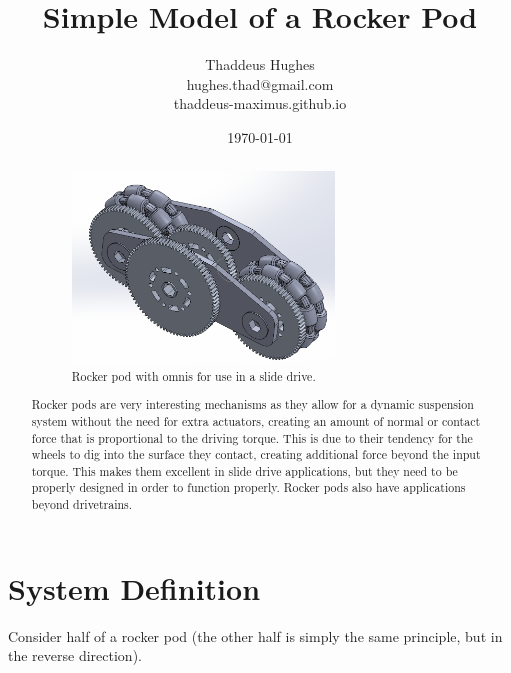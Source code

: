 \documentclass[10pt,letterpaper]{article}
\author{Thaddeus Hughes \\ hughes.thad@gmail.com \\ thaddeus-maximus.github.io}
\date{\today}
\title{Simple Model of a Rocker Pod}
\begin{document}
	\maketitle
	
	\begin{abstract}
		\begin{figure}[H]
			\includegraphics[width=0.7\textwidth]{drivetrain_slide_rocker.png}
			\caption{Rocker pod with omnis for use in a slide drive.}
		\end{figure}
		Rocker pods are very interesting mechanisms as they allow for a dynamic suspension system without the need for extra actuators, creating an amount of normal or contact force that is proportional to the driving torque. This is due to their tendency for the wheels to dig into the surface they contact, creating additional force beyond the input torque. This makes them excellent in slide drive applications, but they need to be properly designed in order to function properly. Rocker pods also have applications beyond drivetrains.
	\end{abstract}
	
	\section*{System Definition}
	
	Consider half of a rocker pod (the other half is simply the same principle, but in the reverse direction).	
	
\end{document}
